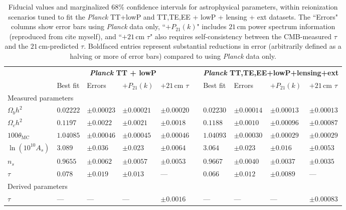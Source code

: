 \documentclass[twocolumn,aps,prd,nofootinbib,showpacs]{revtex4-1}
\begin{document}
\begin{table}
\caption{\label{tab:CosmoParams} Fiducial values and marginalized $68\%$ confidence intervals for astrophysical parameters, within reionization scenarios tuned to fit the \emph{Planck} TT+lowP and TT,TE,EE + lowP + lensing + ext datasets. The ``Errors" columns show error bars using \emph{Planck} data only, ``$+P_{21} (k)$" includes $21\,\textrm{cm}$ power spectrum information (reproduced from \acl{cite myself}), and ``$+21\,\textrm{cm}$ $\tau$" also requires self-consistency between the CMB-measured $\tau$ and the $21\,\textrm{cm}$-predicted $\tau$. Boldfaced entries represent substantial reductions in error (arbitrarily defined as a halving or more of error bars) compared to using \emph{Planck} data only.}
\begin{ruledtabular}
\begin{tabular}{lllllcllll}
 & \multicolumn{4}{c}{\textbf{\emph{Planck} TT + lowP}} && \multicolumn{4}{l}{\textbf{ \emph{Planck} TT,TE,EE+lowP+lensing+ext}  } \\
 & Best fit & Errors &  $+P_{21} (k)$ &$+21\,\textrm{cm}$ $\tau$&& Best fit & Errors &  $+P_{21} (k)$ &  $+21\,\textrm{cm}$ $\tau$\\
\hline
\multicolumn{7}{l}{Measured parameters} \\
$\Omega_b h^2$ \dotfill & $0.02222 $&$ \pm 0.00023$ & $\pm 0.00021$ &  $\pm 0.00020$ && $0.02230 $&$\pm 0.00014$ & $\pm 0.00013$ &  $\pm 0.00013$ \\
$\Omega_c h^2$ \dotfill & $0.1197$&$ \pm 0.0022$  & $\pm 0.0021$ &  $\pm 0.0018$ && $0.1188$&$ \pm 0.0010$ & $\pm 0.00096$ &  $\pm 0.00087$ \\
$100 \theta_\textrm{MC}$\dotfill  & $1.04085 $&$\pm 0.00046$ & $\pm 0.00045$ &  $\pm 0.00046$ & &$1.04093 $&$\pm 0.00030$ & $\pm 0.00029$ & $\pm 0.00029$ \\
$\ln ( 10^{10} A_s) $ \dotfill & $3.089 $&$\pm 0.036$ & $\pm 0.023$ &  $\mathbf{\pm 0.0064}$ & &$3.064$&$ \pm 0.023$ & $\pm 0.016$ & $\mathbf{\pm 0.0053}$  \\
$ n_s $\dotfill  & $ 0.9655$&$ \pm 0.0062$ & $\pm 0.0057$ &  $\pm 0.0053$ && $0.9667$&$ \pm 0.0040$ & $\pm 0.0037$ &  $\pm 0.0035$ \\
$ \tau $ \dotfill & $0.078 $&$\pm 0.019$ & $\pm 0.013$ &  ---  && $0.066 $&$\pm 0.012$ & $\pm 0.0089$ &  --- \\
\hline
\multicolumn{7}{l}{Derived parameters} \\
$ \tau $\dotfill  & --- & ---  & --- & $ \mathbf{\pm 0.0016}$ &&---  & ---  & ---& $ \mathbf{\pm 0.00083}$ \\

\end{tabular}
\end{ruledtabular}
\end{table}
\end{document}
